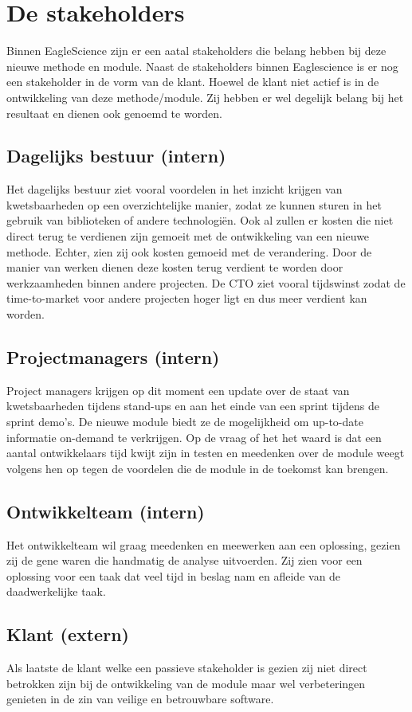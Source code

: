 \section{De stakeholders}\label{sec:de-stakeholders}
Binnen EagleScience zijn er een aatal stakeholders die belang hebben bij deze nieuwe methode en module. Naast de stakeholders binnen Eaglescience is er nog een stakeholder in de vorm van de klant. Hoewel de klant niet actief is in de ontwikkeling van deze methode/module. Zij hebben er wel degelijk belang bij het resultaat en dienen ook genoemd te worden.
\subsection{Dagelijks bestuur (intern)}\label{subsec:dagelijks-bestuur-(intern)}
Het dagelijks bestuur ziet vooral voordelen in het inzicht krijgen van kwetsbaarheden op een overzichtelijke manier, zodat ze kunnen sturen in het gebruik van biblioteken of andere technologiën. Ook al zullen er kosten die niet direct terug te verdienen zijn gemoeit met de ontwikkeling van een nieuwe methode.
Echter, zien zij ook kosten gemoeid met de verandering.
Door de manier van werken dienen deze kosten terug verdient te worden door werkzaamheden binnen andere projecten.
De CTO ziet vooral tijdswinst zodat de time-to-market voor andere projecten hoger ligt en dus meer verdient kan worden.
\subsection{Projectmanagers (intern)}\label{subsec:projectmanagers-(intern)}
Project managers krijgen op dit moment een update over de staat van kwetsbaarheden tijdens stand-ups en aan het einde van een sprint tijdens de sprint demo's.
De nieuwe module biedt ze de mogelijkheid om up-to-date informatie on-demand te verkrijgen.
Op de vraag of het het waard is dat een aantal ontwikkelaars tijd kwijt zijn in testen en meedenken over de module weegt volgens hen op tegen de voordelen die de module in de toekomst kan brengen.
\subsection{Ontwikkelteam (intern)}\label{subsec:ontwikkelteam-(intern)}
Het ontwikkelteam wil graag meedenken en meewerken aan een oplossing, gezien zij de gene waren die handmatig de analyse uitvoerden.
Zij zien voor een oplossing voor een taak dat veel tijd in beslag nam en afleide van de daadwerkelijke taak.
\subsection{Klant (extern)}\label{subsec:klant-(extern)}
Als laatste de klant welke een passieve stakeholder is gezien zij niet direct betrokken zijn bij de ontwikkeling van de module maar wel verbeteringen genieten in de zin van veilige en betrouwbare software.

